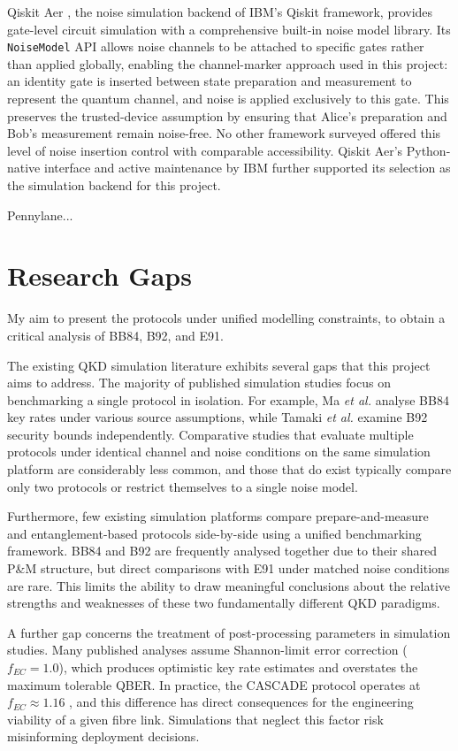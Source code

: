 \documentclass[10pt, a4paper]{report}
\begin{document}
Qiskit Aer \cite{QiskitAer}, the noise simulation backend of IBM's Qiskit framework, provides gate-level circuit simulation with a comprehensive built-in noise model library. Its \texttt{NoiseModel} API allows noise channels to be attached to specific gates rather than applied globally, enabling the channel-marker approach used in this project: an identity gate is inserted between state preparation and measurement to represent the quantum channel, and noise is applied exclusively to this gate. This preserves the trusted-device assumption by ensuring that Alice's preparation and Bob's measurement remain noise-free. No other framework surveyed offered this level of noise insertion control with comparable accessibility. Qiskit Aer's Python-native interface and active maintenance by IBM further supported its selection as the simulation backend for this project.

Pennylane...

\section{Research Gaps}
My aim to present the protocols under unified modelling constraints, to obtain a critical analysis of BB84, B92, and E91.

The existing QKD simulation literature exhibits several gaps that this project aims to address. The majority of published simulation studies focus on benchmarking a single protocol in isolation. For example, Ma \textit{et al.} \cite{Ma2005} analyse BB84 key rates under various source assumptions, while Tamaki \textit{et al.} \cite{Tamaki2014} examine B92 security bounds independently. Comparative studies that evaluate multiple protocols under identical channel and noise conditions on the same simulation platform are considerably less common, and those that do exist typically compare only two protocols or restrict themselves to a single noise model.

Furthermore, few existing simulation platforms compare prepare-and-measure and entanglement-based protocols side-by-side using a unified benchmarking framework. BB84 and B92 are frequently analysed together due to their shared P\&M structure, but direct comparisons with E91 under matched noise conditions are rare. This limits the ability to draw meaningful conclusions about the relative strengths and weaknesses of these two fundamentally different QKD paradigms.

A further gap concerns the treatment of post-processing parameters in simulation studies. Many published analyses assume Shannon-limit error correction ($f_{EC} = 1.0$), which produces optimistic key rate estimates and overstates the maximum tolerable QBER. In practice, the CASCADE protocol operates at $f_{EC} \approx 1.16$ \cite{Cascade1994}, and this difference has direct consequences for the engineering viability of a given fibre link. Simulations that neglect this factor risk misinforming deployment decisions.
\end{document}
